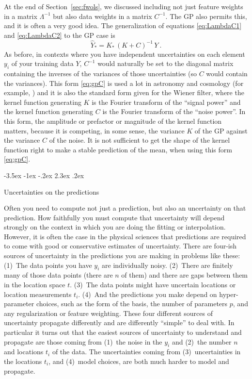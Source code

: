 \documentclass[12pt,letterpaper]{article}
\makeatletter
\renewcommand\section{\@startsection {section}{1}{\z@}%
  {-3.5ex \@plus -1ex \@minus -.2ex}%
  {2.3ex \@plus.2ex}%
  {\raggedright\normalfont\Large\bfseries}}
\newcommand{\sectionname}{Section}
\makeatother
\begin{document}
At the end of \sectionname~\ref{sec:fwols}, we discussed including not just feature weights in a matrix $\Lambda^{-1}$ but also data weights in a matrix $C^{-1}$. The GP also permits this, and it is often a very good idea. The generalization of equations \eqref{eq:LambdaC1} and \eqref{eq:LambdaC2} to the GP case is 
\begin{equation}\label{eq:gpC}
    \hat{Y}_\ast = K_\ast\,(K + C)^{-1}\,Y
    ~.
\end{equation}
As before, in contexts where you have independent uncertainties on each element $y_i$ of your training data $Y$, $C^{-1}$ would naturally be set to the diagonal matrix containing the inverses of the variances of those uncertainties (so $C$ would contain the variances).
This form \eqref{eq:gpC} is used a lot in astronomy and cosmology (for example, \citealt{zaroubi, aigrain, celerite}) and it is also the standard form given for the Wiener filter, where the kernel function generating $K$ is the Fourier transform of the ``signal power'' and the kernel function generating $C$ is the Fourier transform of the ``noise power''.
In this form, the amplitude or prefactor or magnitude of the kernel function matters, because it is competing, in some sense, the variance $K$ of the GP against the variance $C$ of the noise.
It is not sufficient to get the shape of the kernel function right to make a stable prediction of the mean, when using this form \eqref{eq:gpC}.

\section{Uncertainties on the predictions}\label{sec:uncertainty}

Often you need to compute not just a prediction, but also an uncertainty on that prediction.
How faithfully you must compute that uncertainty will depend strongly on the context in which you are doing the fitting or interpolation.
However, it is often the case in the physical sciences that predictions are required to come with good or conservative estimates of uncertainty.
There are four-ish sources of uncertainty in the predictions you are making in problems like these:
(1)~The data points you have $y_i$ are individually noisy.
(2)~There are finitely many of those data points (there are $n$ of them) and there are gaps between them in the location space $t$.
(3)~The data points might have uncertain locations or location measurements $t_i$.
(4)~And the predictions you make depend on hyper-parameter choices, such as the form of the basis, the number of parameters $p$, and any regularization or feature weighting.
These four different sources of uncertainty propagate differently and are differently ``simple'' to deal with.
In particular it turns out that the easiest sources of uncertainty to understand and propagate are those coming from (1)~the noise in the $y_i$ and (2)~the number $n$ and locations $t_i$ of the data.
The uncertainties coming from (3)~uncertainties in the locations $t_i$, and (4)~model choices, are both much harder to model and propagate.
\end{document}
